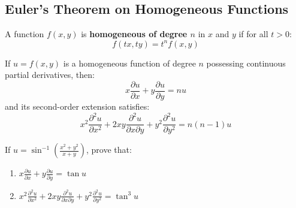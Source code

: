 \subsection{Euler's Theorem on Homogeneous Functions}

\begin{definition}
A function $f(x,y)$ is \textbf{homogeneous of degree $n$} in $x$ and $y$ if for all $t > 0$:
\begin{equation}
    f(tx, ty) = t^n f(x,y)
\end{equation}
\end{definition}

\begin{theorem}
If $u = f(x,y)$ is a homogeneous function of degree $n$ possessing continuous partial derivatives, then:
\begin{equation}
    x \frac{\partial u}{\partial x} + y \frac{\partial u}{\partial y} = n u
\end{equation}
and its second-order extension satisfies:
\begin{equation}
    x^2 \frac{\partial^2 u}{\partial x^2} + 2xy \frac{\partial^2 u}{\partial x \partial y} + y^2 \frac{\partial^2 u}{\partial y^2} = n(n-1) u
\end{equation}
\end{theorem}

\begin{example}
If $u = \sin^{-1}\left(\frac{x^2+y^2}{x+y}\right)$, prove that:
\begin{enumerate}[label=(\alph*)]
    \item $x \frac{\partial u}{\partial x} + y \frac{\partial u}{\partial y} = \tan u$
    \item $x^2 \frac{\partial^2 u}{\partial x^2} + 2xy \frac{\partial^2 u}{\partial x \partial y} + y^2 \frac{\partial^2 u}{\partial y^2} = \tan^3 u$
\end{enumerate}
\end{example}

